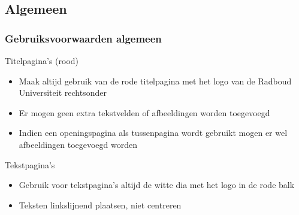 \documentclass[showdate=true, slidenumbers=slide]{beamerruhuisstijl169}
\begin{document}
\subsection{Algemeen}
\begin{frame}\label{sl:gvwa}
    \frametitle{Gebruiksvoorwaarden algemeen}

    \begin{block}{Titelpagina's (rood)}
        \begin{itemize}
            \item Maak altijd gebruik van de rode titelpagina met het logo van de Radboud Universiteit rechtsonder
            \item Er mogen geen extra tekstvelden of afbeeldingen worden toegevoegd
            \item Indien een openingspagina als tussenpagina wordt gebruikt mogen er wel afbeeldingen toegevoegd worden
        \end{itemize}
    \end{block}

    \begin{block}{Tekstpagina's}
        \begin{itemize}
            \item Gebruik voor tekstpagina's altijd de witte dia met het logo in de rode balk
            \item Teksten linkslijnend plaatsen, niet centreren
        \end{itemize}
    \end{block}
\end{frame}
\end{document}
